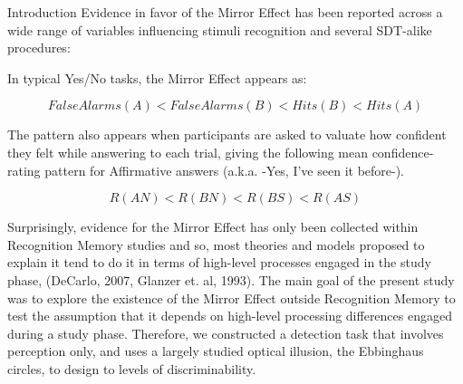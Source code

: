 \documentclass[final]{beamer}
\newlength{\onecolwid}
\begin{document}
\begin{frame}[t]
\begin{columns}[t]
\begin{column}{\onecolwid}
\begin{alertblock}{Introduction}
Evidence in favor of the Mirror Effect has been reported across a wide range of variables influencing stimuli recognition and several SDT-alike procedures:



In typical Yes/No tasks, the Mirror Effect appears as:


\begin{equation}
FalseAlarms(A) < FalseAlarms(B) < Hits(B) < Hits(A)
\label{eqn:Rates}
\end{equation}



The pattern also appears when participants are asked to valuate how confident they felt while answering to each trial, giving the following mean confidence-rating pattern for Affirmative answers (a.k.a. -Yes, I've seen it before-).



\begin{equation}
R(AN) < R(BN) < R(BS) < R(AS)
\label{eqn:Confidence}
\end{equation}




Surprisingly, evidence for the Mirror Effect has only been collected within Recognition Memory studies and so, most theories and models proposed to explain it tend to do it in terms of high-level processes engaged in the study phase, (DeCarlo, 2007, Glanzer et. al, 1993). The main goal of the present study was to explore the existence of the Mirror Effect outside Recognition Memory to test the assumption that it depends on high-level processing differences engaged during a study phase. Therefore, we constructed a detection task that involves perception only, and uses a largely studied optical illusion, the Ebbinghaus circles, to design to levels of discriminability.




\end{alertblock}




\end{column} %


\end{columns}
\end{frame}
\end{document}
